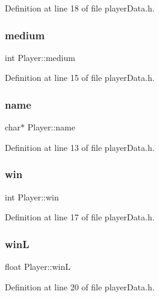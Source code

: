 Definition at line 18 of file player\+Data.\+h.

\hypertarget{struct_player_a1161025ad0b363ff6c68e3a93d83036a}{}\label{struct_player_a1161025ad0b363ff6c68e3a93d83036a} 
\subsubsection{\texorpdfstring{medium}{medium}}
{\footnotesize\ttfamily int Player\+::medium}



Definition at line 15 of file player\+Data.\+h.

\hypertarget{struct_player_a4af4a10433f33834b59d0c3793358a40}{}\label{struct_player_a4af4a10433f33834b59d0c3793358a40} 
\subsubsection{\texorpdfstring{name}{name}}
{\footnotesize\ttfamily char$\ast$ Player\+::name}



Definition at line 13 of file player\+Data.\+h.

\hypertarget{struct_player_af9dd2aa35519c646928b3592f616722d}{}\label{struct_player_af9dd2aa35519c646928b3592f616722d} 
\subsubsection{\texorpdfstring{win}{win}}
{\footnotesize\ttfamily int Player\+::win}



Definition at line 17 of file player\+Data.\+h.

\hypertarget{struct_player_a00459b6a79fdea92d4f718d0c51aa59e}{}\label{struct_player_a00459b6a79fdea92d4f718d0c51aa59e} 
\subsubsection{\texorpdfstring{winL}{winL}}
{\footnotesize\ttfamily float Player\+::winL}



Definition at line 20 of file player\+Data.\+h.

\hypertarget{struct_player_ac5c642a6705035a26aecee0a01a9a769}{}\label{struct_player_ac5c642a6705035a26aecee0a01a9a769} 
